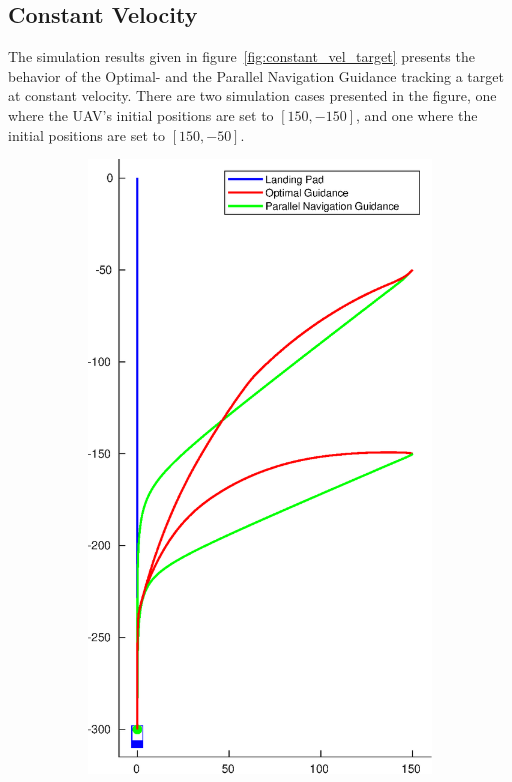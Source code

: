 \subsection{Constant Velocity} %
\label{sub:constant_velocity}
The simulation results given in figure~\ref{fig:constant_vel_target} presents the behavior of the Optimal- and the Parallel Navigation Guidance tracking a target at constant velocity. There are two simulation cases presented in the figure, one where the UAV's initial positions are set to $[150,-150]$, and one where the initial positions are set to $[150,-50]$.
\begin{figure}[h!]
\centering
	\begin{subfigure}{.5\textwidth}
		\centering
		\includegraphics[width=\linewidth]{img/plot/simulation/constant_vel_two_init.eps}

\end{subfigure}
\end{figure}
